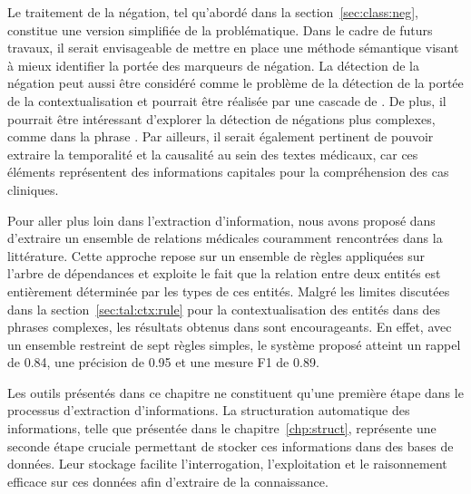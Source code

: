 Le traitement de la négation, tel qu'abordé dans la section~\ref{sec:class:neg}, constitue une version simplifiée de la problématique.
Dans le cadre de futurs travaux, il serait envisageable de mettre en place une méthode sémantique visant à mieux identifier la portée des marqueurs de négation.
La détection de la négation peut aussi être considéré comme le problème de la détection de la portée de la contextualisation et pourrait être réalisée par une cascade de .
De plus, il pourrait être intéressant d'explorer la détection de négations plus complexes, comme dans la phrase .
Par ailleurs, il serait également pertinent de pouvoir extraire la temporalité et la causalité au sein des textes médicaux, car ces éléments représentent des informations capitales pour la compréhension des cas cliniques.

Pour aller plus loin dans l'extraction d'information, nous avons proposé dans \cite{savaryRelationExtractionClinical2022} d'extraire un ensemble de relations médicales couramment rencontrées dans la littérature.
Cette approche repose sur un ensemble de règles appliquées sur l'arbre de dépendances et exploite le fait que la relation entre deux entités est entièrement déterminée par les types de ces entités.
Malgré les limites discutées dans la section~\ref{sec:tal:ctx:rule} pour la contextualisation des entités dans des phrases complexes, les résultats obtenus dans \cite{savaryRelationExtractionClinical2022} sont encourageants.
En effet, avec un ensemble restreint de sept règles simples, le système proposé atteint un rappel de \num{0.84}, une précision de \num{0.95} et une mesure F1 de \num{0.89}.

Les outils présentés dans ce chapitre ne constituent qu'une première étape dans le processus d'extraction d'informations.
La structuration automatique des informations, telle que présentée dans le chapitre~\ref{chp:struct}, représente une seconde étape cruciale permettant de stocker ces informations dans des bases de données.
Leur stockage facilite l'interrogation, l'exploitation et le raisonnement efficace sur ces données afin d'extraire de la connaissance.
